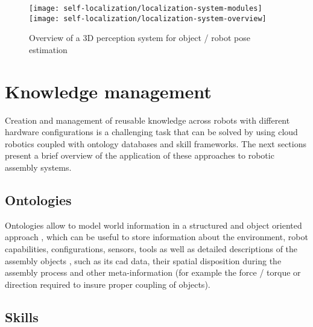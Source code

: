 \begin{figure}[H]
	\centering
	\texttt{[image: self-localization/localization-system-modules]}
	\texttt{[image: self-localization/localization-system-overview]}
	\caption[Overview of a 3D perception system for object / robot pose estimation]{Overview of a 3D perception system for object / robot pose estimation \cite{Costa2016Elsevier}}
	\label{fig:localization-system}
\end{figure}



\section{Knowledge management}

Creation and management of reusable knowledge across robots with different hardware configurations is a challenging task that can be solved by using cloud robotics coupled with ontology databases and skill frameworks. The next sections present a brief overview of the application of these approaches to robotic assembly systems.


\subsection{Ontologies}

Ontologies allow to model world information in a structured and object oriented approach \cite{Lemaignan2012,Stenmark2015}, which can be useful to store information about the environment, robot capabilities, configurations, sensors, tools as well as detailed descriptions of the assembly objects \cite{Perzylo2015}, such as its \gls{cad} data, their spatial disposition during the assembly process and other meta-information (for example the force / torque or direction required to insure proper coupling of objects).



\subsection{Skills}

